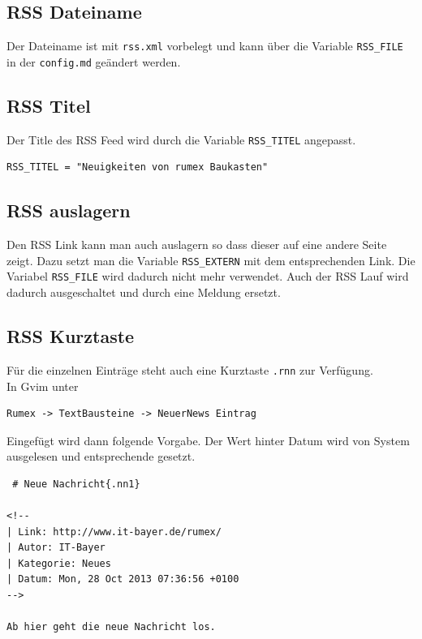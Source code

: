 \documentclass[%
fontsize=12pt,%
parskip=half,%
version=last%
]{scrreprt}
\begin{document}
\subsection{RSS Dateiname}\label{rss-dateiname}

Der Dateiname ist mit \texttt{rss.xml} vorbelegt und kann über die
Variable \texttt{RSS\_FILE} in der \texttt{config.md} geändert werden.

\subsection{RSS Titel}\label{rss-titel}

Der Title des RSS Feed wird durch die Variable \texttt{RSS\_TITEL}
angepasst.

\begin{verbatim}
RSS_TITEL = "Neuigkeiten von rumex Baukasten"
\end{verbatim}

\subsection{RSS auslagern}\label{rss-auslagern}

Den RSS Link kann man auch auslagern so dass dieser auf eine andere
Seite zeigt. Dazu setzt man die Variable \texttt{RSS\_EXTERN} mit dem
entsprechenden Link. Die Variabel \texttt{RSS\_FILE} wird dadurch nicht
mehr verwendet. Auch der RSS Lauf wird dadurch ausgeschaltet und durch
eine Meldung ersetzt.

\subsection{RSS Kurztaste}\label{rss-kurztaste}

Für die einzelnen Einträge steht auch eine Kurztaste \texttt{.rnn} zur
Verfügung.\\In Gvim unter

\begin{verbatim}
Rumex -> TextBausteine -> NeuerNews Eintrag
\end{verbatim}

Eingefügt wird dann folgende Vorgabe. Der Wert hinter Datum wird von
System ausgelesen und entsprechende gesetzt.

\begin{verbatim}
 # Neue Nachricht{.nn1}

<!--
| Link: http://www.it-bayer.de/rumex/
| Autor: IT-Bayer
| Kategorie: Neues
| Datum: Mon, 28 Oct 2013 07:36:56 +0100
-->

Ab hier geht die neue Nachricht los.
\end{verbatim}
\end{document}
